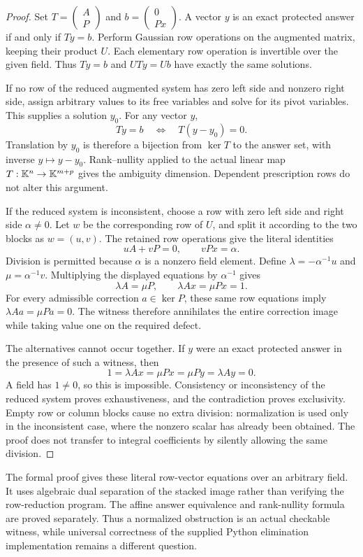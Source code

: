 \begin{proof}
Set \(T=\begin{pmatrix}A\\P\end{pmatrix}\) and \(b=\begin{pmatrix}0\\Px\end{pmatrix}\). A vector \(y\) is an exact protected answer if and only if \(Ty=b\). Perform Gaussian row operations on the augmented matrix, keeping their product \(U\). Each elementary row operation is invertible over the given field. Thus \(Ty=b\) and \(UTy=Ub\) have exactly the same solutions.

If no row of the reduced augmented system has zero left side and nonzero right side, assign arbitrary values to its free variables and solve for its pivot variables. This supplies a solution \(y_0\). For any vector \(y\),
\[
 Ty=b\quad\Longleftrightarrow\quad T(y-y_0)=0.
\]
Translation by \(y_0\) is therefore a bijection from \(\ker T\) to the answer set, with inverse \(y\mapsto y-y_0\). Rank--nullity applied to the actual linear map \(T:\mathbb K^n\to\mathbb K^{m+p}\) gives the ambiguity dimension. Dependent prescription rows do not alter this argument.

If the reduced system is inconsistent, choose a row with zero left side and right side \(\alpha\ne0\). Let \(w\) be the corresponding row of \(U\), and split it according to the two blocks as \(w=(u,v)\). The retained row operations give the literal identities
\[
 uA+vP=0,\qquad vPx=\alpha.
\]
Division is permitted because \(\alpha\) is a nonzero field element. Define \(\lambda=-\alpha^{-1}u\) and \(\mu=\alpha^{-1}v\). Multiplying the displayed equations by \(\alpha^{-1}\) gives
\[
 \lambda A=\mu P,\qquad \lambda Ax=\mu Px=1.
\]
For every admissible correction \(a\in\ker P\), these same row equations imply \(\lambda Aa=\mu Pa=0\). The witness therefore annihilates the entire correction image while taking value one on the required defect.

The alternatives cannot occur together. If \(y\) were an exact protected answer in the presence of such a witness, then
\[
 1=\lambda Ax=\mu Px=\mu Py=\lambda Ay=0.
\]
A field has \(1\ne0\), so this is impossible. Consistency or inconsistency of the reduced system proves exhaustiveness, and the contradiction proves exclusivity. Empty row or column blocks cause no extra division: normalization is used only in the inconsistent case, where the nonzero scalar has already been obtained. The proof does not transfer to integral coefficients by silently allowing the same division.
\end{proof}
The formal proof gives these literal row-vector equations over an arbitrary field. It uses algebraic dual separation of the stacked image rather than verifying the row-reduction program. The affine answer equivalence and rank-nullity formula are proved separately. Thus a normalized obstruction is an actual checkable witness, while universal correctness of the supplied Python elimination implementation remains a different question.

